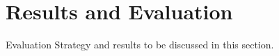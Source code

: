 %
%
%
\chapter{Results and Evaluation}\label{ch:reseval}
Evaluation Strategy and results to be discussed in this section.
